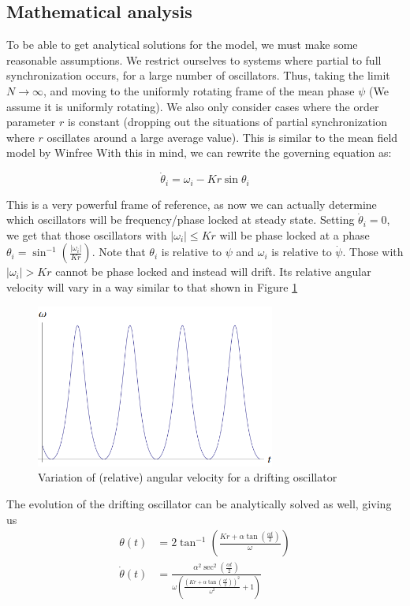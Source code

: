 \documentclass[12pt]{article}
\begin{document}
\subsection{Mathematical analysis}

To be able to get analytical solutions for the model, we must make some reasonable assumptions.
We restrict ourselves to systems where partial to full synchronization occurs, for a large number of oscillators.  Thus, taking the limit $N\to\infty$, and moving to the uniformly rotating frame of the mean phase $\psi$ (We assume it is uniformly rotating). We also only consider cases where the order parameter $r$ is constant (dropping out the situations of partial synchronization where $r$ oscillates around a large average value). This is similar to the mean field model by Winfree\cite{winfree1967biological}
With this in mind, we can rewrite the governing equation as\cite{strogatz2000kuramoto}:

$$\dot\theta_i = \omega_i - Kr\sin{\theta_i}$$

This is a very powerful frame of reference, as now we can actually determine which oscillators will be frequency/phase locked at steady state. Setting $\dot\theta_i = 0$, we get that those oscillators with $|\omega_i| \leq Kr$ will be phase locked at a phase $\theta_i = \sin^{-1}\left(\frac{|\omega_i|}{Kr}\right)$. Note that $\theta_i$ is relative to $\psi$ and $\omega_i$ is relative to $\dot\psi$. Those with $|\omega_i| > Kr$ cannot be phase locked and instead will drift. Its relative angular velocity will vary in a way similar to that shown in Figure \ref{fig:math:drift}
\begin{figure}
\centering
\includegraphics[width=0.7\textwidth]{data/drift}
\caption{Variation of (relative) angular velocity for a drifting oscillator}
\label{fig:math:drift}
\end{figure}

The evolution of the drifting oscillator can be analytically solved as well, giving us 
\begin{align*}
\theta(t) &= 2 \tan ^{-1}\left(\frac{K r+\alpha  \tan \left(\frac{\alpha  t}{2}\right)}{\omega }\right)\\
\dot\theta(t) &= \frac{\alpha ^2 \sec ^2\left(\frac{\alpha  t}{2}\right)}{\omega  \left(\frac{\left(K r+\alpha  \tan \left(\frac{\alpha  t}{2}\right)\right)^2}{\omega ^2}+1\right)}
\end{align*}
\end{document}
